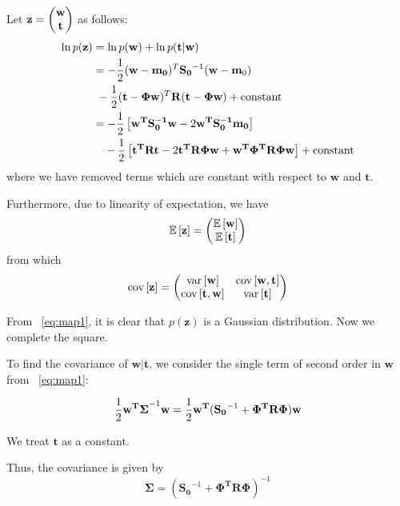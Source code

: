 \documentclass[reqno]{amsart}
\begin{document}
\begin{enumerate}[label=\textbf{(\Roman*)}]
\begin{enumerate}[label=\textbf{(\alph*)}]
                Let \(\mathbf{z} = \begin{pmatrix}\mathbf{w} \\ \mathbf{t}\end{pmatrix}\) as follows:
                \begin{align}
                    \begin{split}
                        \ln p(\mathbf{z}) &= \ln p(\mathbf{w}) + \ln p(\mathbf{t|w}) \\
                            &= -\frac{1}{2} (\mathbf{w - m_0})^T \mathbf{S_0}^{-1} (\mathbf{w - m}_0) \\
                            &\ - \frac{1}{2} (\mathbf{t - \Phi w})^T \mathbf{R} (\mathbf{t - \Phi w}) + \text{constant} \label{eq:map1} \\
                            &= -\frac{1}{2}\left[\mathbf{w^T S_0^{-1} w} - 2 \mathbf{w^T S_0^{-1} m_0}\right] \\
                            &\quad -\frac{1}{2} \left[\mathbf{t^T R t} - 2 \mathbf{t^T R \Phi w} + \mathbf{w^T \Phi^T R \Phi w}\right] + \text{constant} \\
                    \end{split}
                \end{align}
                where we have removed terms which are constant with respect to \(\mathbf{w}\) and \(\mathbf{t}\).

                Furthermore, due to linearity of expectation, we have 
                \[\mathbb{E}\left[\mathbf{z}\right] = \begin{pmatrix}\mathbb{E}\left[\mathbf{w}\right] \\ \mathbb{E}\left[\mathbf{t}\right]\end{pmatrix}\]
                from which
                \[\text{cov}\left[\mathbf{z}\right] = \begin{pmatrix}
                    \text{var}\left[\mathbf{w}\right] & \text{cov}\left[\mathbf{w}, \mathbf{t}\right] \\
                    \text{cov}\left[\mathbf{t}, \mathbf{w}\right] & \text{var}\left[\mathbf{t}\right]
                \end{pmatrix}\]

                From ~\eqref{eq:map1}, it is clear that \(p(\mathbf{z})\) is a Gaussian distribution. Now we complete the square.
                
                To find the covariance of \(\mathbf{w|t}\), we consider the single term of second order in \(\mathbf{w}\) from ~\eqref{eq:map1}: 

                \[\frac{1}{2} \mathbf{w^T \Sigma}^{-1}\mathbf{w} = \frac{1}{2} \mathbf{w^T}(\mathbf{S_0}^{-1} + \mathbf{\Phi^T R \Phi})\mathbf{w} \]

                We treat \(\mathbf{t}\) as a constant.

                Thus, the covariance is given by \[\mathbf{\Sigma} = (\mathbf{S_0}^{-1} + \mathbf{\Phi^T R \Phi})^{-1}\]


\end{enumerate}
\end{enumerate}
\end{document}
